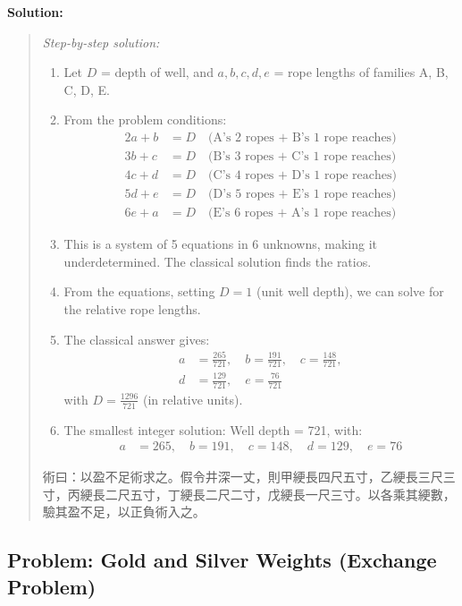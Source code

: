 \documentclass[11pt,a4paper]{article}
\newcommand{\zh}[1]{{#1}}
\newenvironment{chsolution}{%
  \par\medskip\noindent\textbf{\textcolor{notecolor}{Solution:}}\par\nopagebreak
  \begin{quote}\small
}{%
  \end{quote}\medskip
}
\newenvironment{stepbystep}{%
  \par\smallskip\noindent\textit{Step-by-step solution:}\par\nopagebreak
  \begin{enumerate}[leftmargin=2em,label=\textbf{Step \arabic*:},ref=\arabic*]
}{%
  \end{enumerate}\medskip
}
\begin{document}
\begin{chsolution}
\begin{stepbystep}
\item Let $D$ = depth of well, and $a, b, c, d, e$ = rope lengths of families A, B, C, D, E.

\item From the problem conditions:
\begin{align*}
2a + b &= D \quad \text{(A's 2 ropes + B's 1 rope reaches)} \\
3b + c &= D \quad \text{(B's 3 ropes + C's 1 rope reaches)} \\
4c + d &= D \quad \text{(C's 4 ropes + D's 1 rope reaches)} \\
5d + e &= D \quad \text{(D's 5 ropes + E's 1 rope reaches)} \\
6e + a &= D \quad \text{(E's 6 ropes + A's 1 rope reaches)}
\end{align*}

\item This is a system of 5 equations in 6 unknowns, making it underdetermined.
The classical solution finds the ratios.

\item From the equations, setting $D = 1$ (unit well depth), we can solve for
the relative rope lengths.

\item The classical answer gives:
\begin{align*}
a &= \frac{265}{721}, \quad b = \frac{191}{721}, \quad c = \frac{148}{721}, \\
d &= \frac{129}{721}, \quad e = \frac{76}{721}
\end{align*}
with $D = \frac{1296}{721}$ (in relative units).

\item The smallest integer solution: Well depth = 721, with:
\begin{align*}
a &= 265, \quad b = 191, \quad c = 148, \quad d = 129, \quad e = 76
\end{align*}
\end{stepbystep}

\zh{術曰：以盈不足術求之。假令井深一丈，則甲綆長四尺五寸，乙綆長三尺三寸，丙綆長二尺五寸，丁綆長二尺二寸，戊綆長一尺三寸。以各乘其綆數，驗其盈不足，以正負術入之。}
\end{chsolution}

\subsection{Problem: Gold and Silver Weights (Exchange Problem)}
\end{document}
